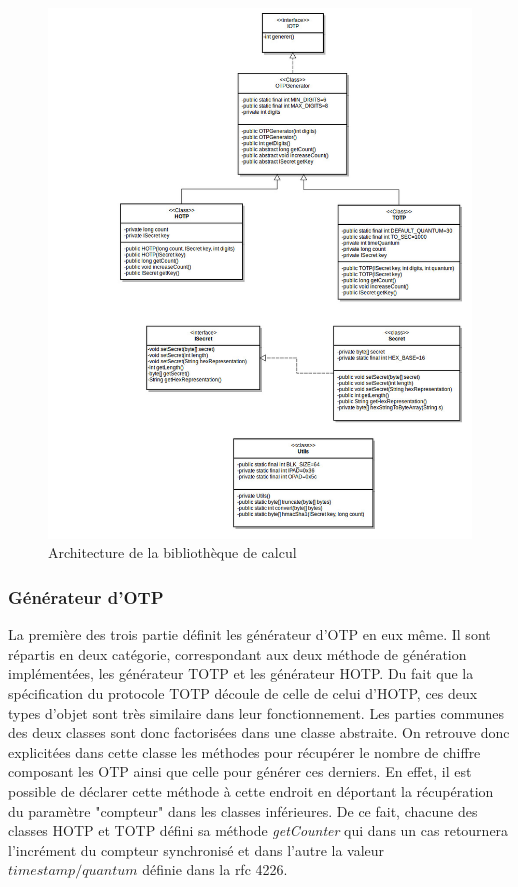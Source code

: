 \begin{figure}
  \centering
  \includegraphics[scale=0.4]{../graphics/uml_lib.jpg}
  \caption{Architecture de la bibliothèque de calcul}
  \label{fig:umlLib}
\end{figure}

\subsubsection{Générateur d'OTP}
La première des trois partie définit les générateur d'OTP en eux même. Il sont répartis en
deux catégorie, correspondant aux deux méthode de génération implémentées, les générateur
TOTP et les générateur HOTP. Du fait que la spécification du protocole TOTP découle de celle
de celui d'HOTP, ces deux types d'objet sont très similaire dans leur fonctionnement. Les
parties communes des deux classes sont donc factorisées dans une classe abstraite. On
retrouve donc explicitées dans cette classe les méthodes pour récupérer le nombre de chiffre
composant les OTP ainsi que celle pour générer ces derniers. En effet, il est possible de
déclarer cette méthode à cette endroit en déportant la récupération du paramètre "compteur"
dans les classes inférieures. De ce fait, chacune des classes HOTP et TOTP défini sa
méthode \emph{getCounter} qui dans un cas retournera l'incrément du compteur synchronisé et
dans l'autre la valeur $ timestamp / quantum $ définie dans la rfc 4226\cite{TOTP}.

